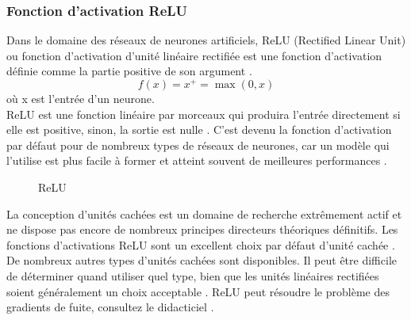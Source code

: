 	
	
	
	\subsubsection{Fonction d'activation ReLU}\label{subsec:relu}
	
	Dans le domaine des réseaux de neurones artificiels, ReLU (Rectified Linear Unit) ou fonction d'activation d'unité linéaire rectifiée est une fonction d'activation définie comme la partie positive de son argument \cite{goodfellow2016deep}.
	$${\displaystyle f(x)=x^{+}=\max(0,x)}$$
	où x est l'entrée d'un neurone.\\
	ReLU est une fonction linéaire par morceaux qui produira l'entrée directement si elle est positive, sinon, la sortie est nulle \cite{tammina2019transfer}. C'est devenu la fonction d'activation par défaut pour de nombreux types de réseaux de neurones, car un modèle qui l'utilise est plus facile à former et atteint souvent de meilleures performances \cite{geron2017hands}.
	
	
	
	\begin{figure}
		\caption{ReLU}\label{fig:relu}
	\end{figure}
	
	La conception d'unités cachées est un domaine de recherche extrêmement actif et ne dispose pas encore de nombreux principes directeurs théoriques définitifs.
	Les fonctions d'activations ReLU sont un excellent choix par défaut d'unité cachée \cite{goodfellow2016deep}.\\De nombreux autres types d'unités cachées sont disponibles. Il peut être diﬃcile de déterminer quand utiliser quel type, bien que les unités linéaires rectiﬁées soient généralement un choix acceptable \cite{goodfellow2016deep}. ReLU peut résoudre le problème des gradients de fuite, consultez le didacticiel \cite{pretorius2018critical}.
	
